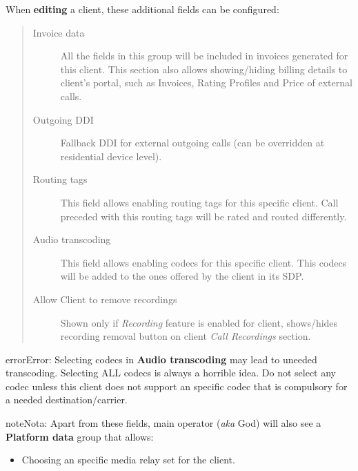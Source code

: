 \documentclass[letterpaper,10pt,spanish]{sphinxmanual}
\begin{document}
When \textbf{editing} a client, these additional fields can be configured:
\begin{quote}
\begin{description}
\item[{Invoice data}] \leavevmode
All the fields in this group will be included in invoices generated for this client. This section also allows
showing/hiding billing details to client's portal, such as Invoices, Rating Profiles and Price of external calls.

\item[{Outgoing DDI}] \leavevmode
Fallback DDI for external outgoing calls (can be overridden at residential device level).

\item[{Routing tags}] \leavevmode
This field allows enabling routing tags for this specific client. Call preceded with this
routing tags will be rated and routed differently.

\item[{Audio transcoding}] \leavevmode
This field allows enabling codecs for this specific client. This codecs will be added to
the ones offered by the client in its SDP.

\item[{Allow Client to remove recordings}] \leavevmode
Shown only if \emph{Recording} feature is enabled for client, shows/hides recording
removal button on client \emph{Call Recordings} section.

\end{description}
\end{quote}

\begin{notice}{error}{Error:}
Selecting codecs in \textbf{Audio transcoding} may lead to uneeded transcoding. Selecting ALL codecs is
always a horrible idea. Do not select any codec unless this client does not support an specific codec
that is compulsory for a needed destination/carrier.
\end{notice}

\begin{notice}{note}{Nota:}
Apart from these fields, main operator (\emph{aka} God) will also see a \textbf{Platform data} group that allows:
\begin{itemize}
\item {} 
Choosing an specific media relay set for the client.

\end{itemize}
\end{notice}
\end{document}
